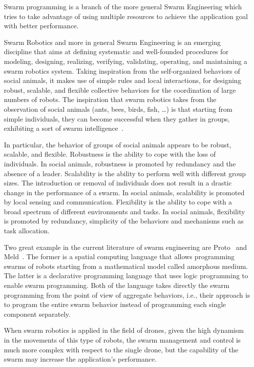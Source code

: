 Swarm programming is a branch of the more general Swarm Engineering which tries to take advantage of using multiple resources to 
achieve the application goal with better performance.

Swarm Robotics and more in general Swarm Engineering is an emerging discipline that aims at defining systematic 
and well-founded procedures for modeling, designing, realizing, verifying, validating, operating, and maintaining 
a swarm robotics system. Taking inspiration from the self-organized behaviors of social animals, it makes use of simple 
rules and local interactions, for designing robust, scalable, and flexible collective behaviors for the coordination of large numbers of robots.
The inspiration that swarm robotics takes from the observation of social animals (ants, bees, birds, fish, …) is that starting from simple individuals,
they can become successful when they gather in groups, exhibiting a sort of swarm intelligence~\cite{bonabeau1999swarm}.

In particular, the behavior of groups of social animals appears to be robust, scalable, and flexible. 
Robustness is the ability to cope with the loss of individuals. 
In social animals, robustness is promoted by redundancy and the absence of a leader. 
Scalability is the ability to perform well with different group sizes. 
The introduction or removal of individuals does not result in a drastic change in the performance of a swarm. 
In social animals, scalability is promoted by local sensing and communication. 
Flexibility is the ability to cope with a broad spectrum of different environments and tasks. 
In social animals, flexibility is promoted by redundancy, simplicity of the behaviors and mechanisms such as task allocation.

Two great example in the current literature of swarm engineering are Proto~\cite{bachrach2010proto} and Meld~\cite{ashley2007meld}. 
The former is a spatial computing language that allows programming swarms of robots starting from a mathematical model called amorphous medium.
The latter is a declarative programming language that uses logic programming to enable swarm programming.
Both of the language takes directly the swarm programming from the point of view of aggregate behaviors, i.e., their approach is to program the entire
swarm behavior instead of programming each single component separately.

When swarm robotics is applied in the field of drones, given the high dynamism in the movements of this type of robots, 
the swarm management and control is much more complex with respect to the single drone, 
but the capability of the swarm may increase the application's performance.

